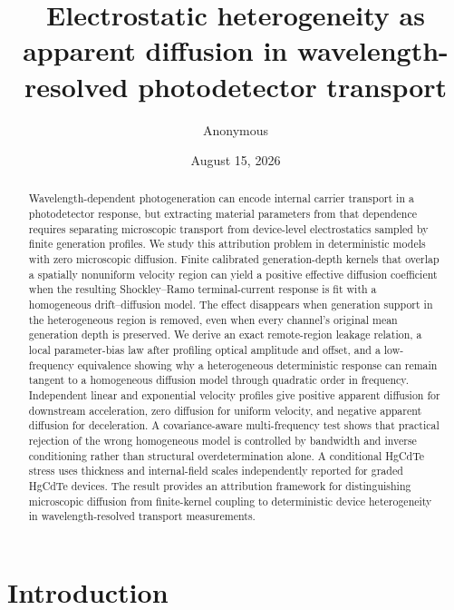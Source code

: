 \documentclass[aps,pra,twocolumn,superscriptaddress,nofootinbib]{revtex4-2}
\begin{document}
\title{Electrostatic heterogeneity as apparent diffusion in wavelength-resolved photodetector transport}

\author{Anonymous}

\date{August 15, 2026}

\begin{abstract}
Wavelength-dependent photogeneration can encode internal carrier transport in a photodetector response, but extracting material parameters from that dependence requires separating microscopic transport from device-level electrostatics sampled by finite generation profiles. We study this attribution problem in deterministic models with zero microscopic diffusion. Finite calibrated generation-depth kernels that overlap a spatially nonuniform velocity region can yield a positive effective diffusion coefficient when the resulting Shockley--Ramo terminal-current response is fit with a homogeneous drift--diffusion model. The effect disappears when generation support in the heterogeneous region is removed, even when every channel's original mean generation depth is preserved. We derive an exact remote-region leakage relation, a local parameter-bias law after profiling optical amplitude and offset, and a low-frequency equivalence showing why a heterogeneous deterministic response can remain tangent to a homogeneous diffusion model through quadratic order in frequency. Independent linear and exponential velocity profiles give positive apparent diffusion for downstream acceleration, zero diffusion for uniform velocity, and negative apparent diffusion for deceleration. A covariance-aware multi-frequency test shows that practical rejection of the wrong homogeneous model is controlled by bandwidth and inverse conditioning rather than structural overdetermination alone. A conditional HgCdTe stress uses thickness and internal-field scales independently reported for graded HgCdTe devices. The result provides an attribution framework for distinguishing microscopic diffusion from finite-kernel coupling to deterministic device heterogeneity in wavelength-resolved transport measurements.
\end{abstract}

\maketitle

\section{Introduction}
\end{document}
